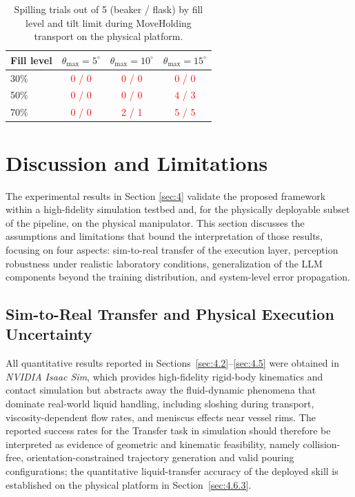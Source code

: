 \documentclass{ieeeaccess}
\newif\ifhighlight
\newcommand{\rev}[1]{\ifhighlight\hl{#1}\else#1\fi}
\newcommand{\nd}[1]{\textcolor{red}{#1}}
\newcommand{\revbox}[1]{\ifhighlight\noindent\colorbox{yellow}{\parbox{\dimexpr\linewidth-2\fboxsep\relax}{#1}}\else#1\fi}
\begin{document}
\begin{table}[t]
\revbox{%
\centering
\caption{Spilling trials out of 5 (beaker / flask) by fill level and tilt limit during MoveHolding transport on the physical platform.}\label{tab:spill}
\begin{tabular*}{\linewidth}{@{\extracolsep{\fill}}lccc@{}}
\toprule
Fill level & $\theta_{\max}=5^\circ$ & $\theta_{\max}=10^\circ$ & $\theta_{\max}=15^\circ$ \\
\midrule
30\% & \nd{0 / 0} & \nd{0 / 0} & \nd{0 / 0} \\
50\% & \nd{0 / 0} & \nd{0 / 0} & \nd{4 / 3} \\
70\% & \nd{0 / 0} & \nd{2 / 1} & \nd{5 / 5} \\
\bottomrule
\end{tabular*}}
\end{table}

\section{Discussion and Limitations}\label{sec:5}
The experimental results in Section \ref{sec:4} validate the proposed framework within a high-fidelity simulation testbed \rev{and, for the physically deployable subset of the pipeline, on the physical manipulator}.
This section discusses the assumptions and limitations that bound the interpretation of those results, focusing on four aspects: sim-to-real transfer of the execution layer, perception robustness under realistic laboratory conditions, generalization of the LLM components beyond the training distribution, and system-level error propagation.

\subsection{Sim-to-Real Transfer and Physical Execution Uncertainty}\label{sec:5.1}
All quantitative results reported in \rev{Sections~\ref{sec:4.2}--\ref{sec:4.5}} were obtained in \textit{NVIDIA Isaac Sim}, which provides high-fidelity rigid-body kinematics and contact simulation but abstracts away the fluid-dynamic phenomena that dominate real-world liquid handling, including sloshing during transport, viscosity-dependent flow rates, and meniscus effects near vessel rims. The reported success rates for the Transfer task \rev{in simulation} should therefore be interpreted as evidence of geometric and kinematic feasibility, namely collision-free, orientation-constrained trajectory generation and valid pouring configurations\rev{; the quantitative liquid-transfer accuracy of the deployed skill is established on the physical platform in Section~\ref{sec:4.6.3}}.
\end{document}
